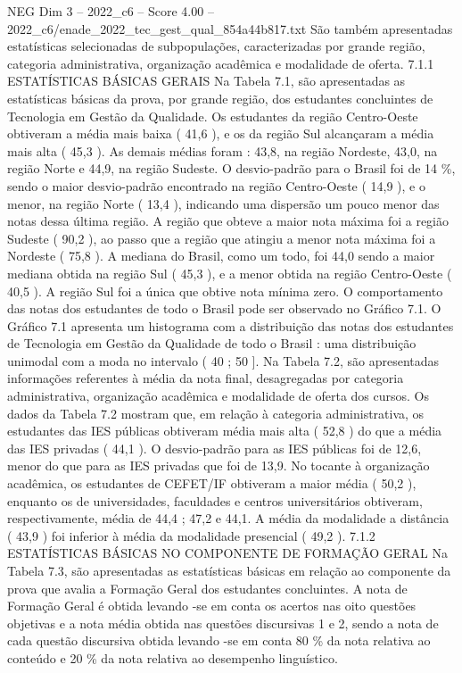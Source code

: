 \begin{textsample}{NEG Dim 3 – 2022\_c6 – Score 4.00 – 2022\_c6/enade\_2022\_tec\_gest\_qual\_854a44b817.txt}
São também apresentadas estatísticas selecionadas de subpopulações, caracterizadas por grande região, categoria administrativa, organização acadêmica e modalidade de oferta. 7.1.1 ESTATÍSTICAS BÁSICAS GERAIS Na Tabela 7.1, são apresentadas as estatísticas básicas da prova, por grande região, dos estudantes concluintes de Tecnologia em Gestão da Qualidade.
Os estudantes da região Centro-Oeste obtiveram a média mais baixa ( 41,6 ), e os da região Sul alcançaram a média mais alta ( 45,3 ).
As demais médias foram : 43,8, na região Nordeste, 43,0, na região Norte e 44,9, na região Sudeste.
O desvio-padrão para o Brasil foi de 14 \%, sendo o maior desvio-padrão encontrado na região Centro-Oeste ( 14,9 ), e o menor, na região Norte ( 13,4 ), indicando uma dispersão um pouco menor das notas dessa última região.
A região que obteve a maior nota máxima foi a região Sudeste ( 90,2 ), ao passo que a região que atingiu a menor nota máxima foi a Nordeste ( 75,8 ).
A mediana do Brasil, como um todo, foi 44,0 sendo a maior mediana obtida na região Sul ( 45,3 ), e a menor obtida na região Centro-Oeste ( 40,5 ).
A região Sul foi a única que obtive nota mínima zero.
O comportamento das notas dos estudantes de todo o Brasil pode ser observado no Gráfico 7.1.
O Gráfico 7.1 apresenta um histograma com a distribuição das notas dos estudantes de Tecnologia em Gestão da Qualidade de todo o Brasil : uma distribuição unimodal com a moda no intervalo ( 40 ; 50 ].
Na Tabela 7.2, são apresentadas informações referentes à média da nota final, desagregadas por categoria administrativa, organização acadêmica e modalidade de oferta dos cursos.
Os dados da Tabela 7.2 mostram que, em relação à categoria administrativa, os estudantes das IES públicas obtiveram média mais alta ( 52,8 ) do que a média das IES privadas ( 44,1 ).
O desvio-padrão para as IES públicas foi de 12,6, menor do que para as IES privadas que foi de 13,9.
No tocante à organização acadêmica, os estudantes de CEFET/IF obtiveram a maior média ( 50,2 ), enquanto os de universidades, faculdades e centros universitários obtiveram, respectivamente, média de 44,4 ; 47,2 e 44,1.
A média da modalidade a distância ( 43,9 ) foi inferior à média da modalidade presencial ( 49,2 ). 7.1.2 ESTATÍSTICAS BÁSICAS NO COMPONENTE DE FORMAÇÃO GERAL Na Tabela 7.3, são apresentadas as estatísticas básicas em relação ao componente da prova que avalia a Formação Geral dos estudantes concluintes.
A nota de Formação Geral é obtida levando -se em conta os acertos nas oito questões objetivas e a nota média obtida nas questões discursivas 1 e 2, sendo a nota de cada questão discursiva obtida levando -se em conta 80 \% da nota relativa ao conteúdo e 20 \% da nota relativa ao desempenho linguístico.

\end{textsample}
